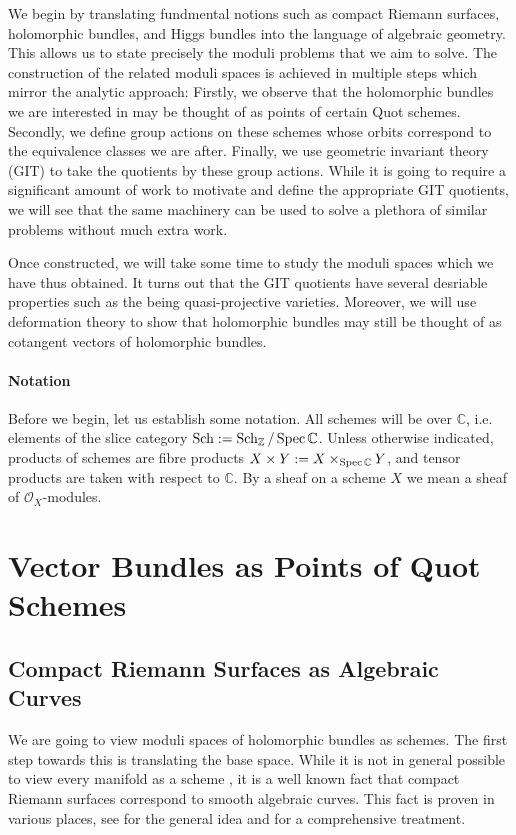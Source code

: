 \documentclass[12pt]{ociamthesis}  %
\begin{document}
We begin by translating fundmental notions such as compact
Riemann surfaces, holomorphic bundles, and Higgs bundles into
the language of algebraic geometry. This allows us to state
precisely the moduli problems that we aim to solve. The construction
of the related moduli spaces is achieved in multiple steps which
mirror the analytic approach: Firstly, we observe that the
holomorphic bundles we are interested in may be thought of as
points of certain Quot schemes. Secondly, we define group
actions on these schemes whose orbits correspond to the
equivalence classes we are after. Finally, we use geometric
invariant theory (GIT) to take the quotients by these group
actions. While it is going to require a significant amount of
work to motivate and define the appropriate GIT quotients,
we will see that the same machinery can be used to solve
a plethora of similar problems without much extra work.

Once constructed, we will take some time to study the moduli
spaces which we have thus obtained. It turns out that the GIT
quotients have several desriable properties such as the being
quasi-projective varieties. Moreover, we will use deformation
theory to show that holomorphic bundles may still be thought
of as cotangent vectors of holomorphic bundles.

\paragraph*{Notation}

Before we begin, let us establish some notation. All schemes
will be over $\mathbb{C}$, i.e. elements of the slice category
$\operatorname{Sch} := \operatorname{Sch}_{\mathbb{Z}}/\operatorname{Spec}\mathbb{C}$. Unless otherwise
indicated, products of schemes are fibre products
$X\times Y := X\times_{\operatorname{Spec}\mathbb{C}} Y$, and
tensor products are taken with respect to $\mathbb{C}$.
By a sheaf on a scheme $X$ we mean a sheaf of $\mathcal O_X$-modules.

\section{Vector Bundles as Points of Quot Schemes}

\missingsection

\subsection{Compact Riemann Surfaces as Algebraic Curves}

We are going to view moduli spaces of holomorphic bundles
as schemes. The first step towards this is translating the
base space. While it is not in general possible to view
every manifold as a scheme \missingcitation, it is a well
known fact that compact Riemann surfaces correspond to smooth
algebraic curves.
This fact is proven in various places, see \cite[215]{griffiths1994}
for the general idea and \cite[5-16]{harris2011}
for a comprehensive treatment.
\end{document}
